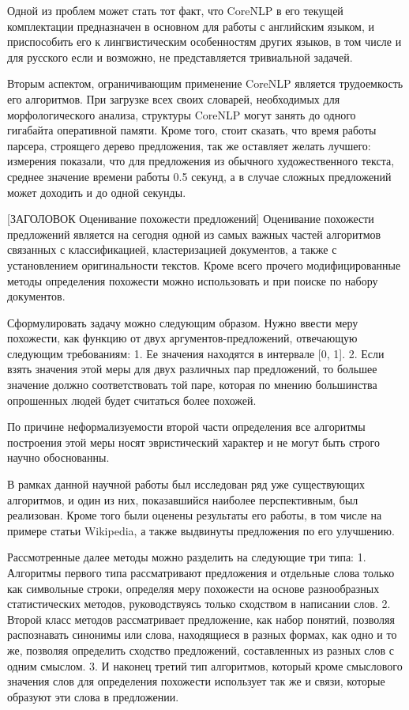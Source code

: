 Одной из проблем может стать тот факт, что CoreNLP в его текущей комплектации
предназначен в основном для работы с английским языком, 
и приспособить его к лингвистическим особенностям других языков, в том числе и для русского
если и возможно, не представляется тривиальной задачей.

Вторым аспектом, ограничивающим применение CoreNLP является трудоемкость
его алгоритмов. При загрузке всех своих словарей, необходимых для морфологического
анализа, структуры CoreNLP могут занять до одного гигабайта оперативной памяти.
Кроме того, стоит сказать, что время работы парсера, строящего дерево предложения,
так же оставляет желать лучшего: измерения показали, что для предложения
из обычного художественного текста, среднее значение времени работы 0.5 секунд,
а в случае сложных предложений может доходить и до одной секунды.

[ЗАГОЛОВОК Оценивание похожести предложений]
Оценивание похожести предложений является на сегодня одной из самых важных
частей алгоритмов связанных с классификацией, кластеризацией документов, а также
с установлением оригинальности текстов. Кроме всего прочего модифицированные методы определения
похожести можно использовать и при поиске по набору документов.

Сформулировать задачу можно следующим образом. Нужно ввести меру похожести,
как функцию от двух аргументов-предложений, отвечающую следующим требованиям:
1. Ее значения находятся в интервале [0, 1].
2. Если взять значения этой меры для двух различных пар предложений, 
то большее значение должно соответствовать той паре, которая по мнению
большинства опрошенных людей будет считаться более похожей.

По причине неформализуемости второй части определения все алгоритмы 
построения этой меры носят эвристический характер и не могут быть строго научно обоснованны.

В рамках данной научной работы был исследован ряд уже существующих алгоритмов,
и один из них, показавшийся наиболее перспективным, был реализован.
Кроме того были оценены результаты его работы, в том числе на примере статьи Wikipedia, 
а также выдвинуты предложения по его улучшению.

Рассмотренные далее методы можно разделить на следующие три типа:
1. Алгоритмы первого типа\cite{statisticalSim} рассматривают предложения и отдельные слова только как символьные строки, 
определяя меру похожести на основе разнообразных статистических методов, руководствуясь только сходством в написании слов.
2. Второй класс методов\cite{wordnetSim} рассматривает предложение, как набор понятий, позволяя распознавать синонимы 
или слова, находящиеся в разных формах, как одно и то же, позволяя определить сходство предложений, 
составленных из разных слов с одним смыслом.
3. И наконец третий тип алгоритмов\cite{weightedDep}\cite{complexSim}, который кроме смыслового значения слов для определения похожести
использует так же и связи, которые образуют эти слова в предложении.

